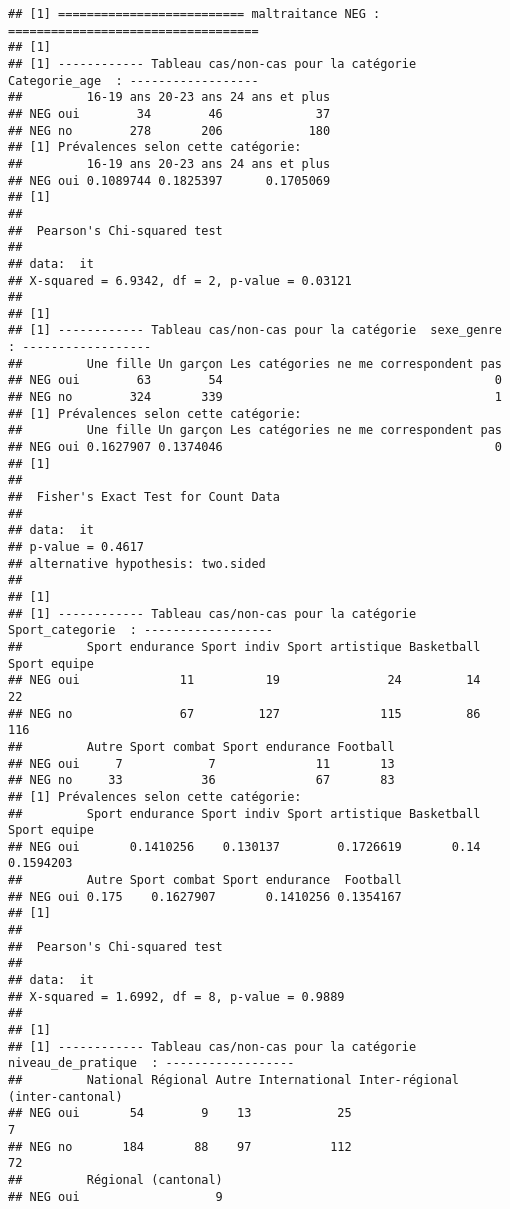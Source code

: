 \documentclass[
]{article}
\begin{document}
\begin{verbatim}
## [1] ========================== maltraitance NEG : ===================================
## [1] 
## [1] ------------ Tableau cas/non-cas pour la catégorie  Categorie_age  : ------------------
##         16-19 ans 20-23 ans 24 ans et plus
## NEG oui        34        46             37
## NEG no        278       206            180
## [1] Prévalences selon cette catégorie:
##         16-19 ans 20-23 ans 24 ans et plus
## NEG oui 0.1089744 0.1825397      0.1705069
## [1] 
## 
##  Pearson's Chi-squared test
## 
## data:  it
## X-squared = 6.9342, df = 2, p-value = 0.03121
## 
## [1] 
## [1] ------------ Tableau cas/non-cas pour la catégorie  sexe_genre  : ------------------
##         Une fille Un garçon Les catégories ne me correspondent pas
## NEG oui        63        54                                      0
## NEG no        324       339                                      1
## [1] Prévalences selon cette catégorie:
##         Une fille Un garçon Les catégories ne me correspondent pas
## NEG oui 0.1627907 0.1374046                                      0
## [1] 
## 
##  Fisher's Exact Test for Count Data
## 
## data:  it
## p-value = 0.4617
## alternative hypothesis: two.sided
## 
## [1] 
## [1] ------------ Tableau cas/non-cas pour la catégorie  Sport_categorie  : ------------------
##         Sport endurance Sport indiv Sport artistique Basketball Sport equipe
## NEG oui              11          19               24         14           22
## NEG no               67         127              115         86          116
##         Autre Sport combat Sport endurance Football
## NEG oui     7            7              11       13
## NEG no     33           36              67       83
## [1] Prévalences selon cette catégorie:
##         Sport endurance Sport indiv Sport artistique Basketball Sport equipe
## NEG oui       0.1410256    0.130137        0.1726619       0.14    0.1594203
##         Autre Sport combat Sport endurance  Football
## NEG oui 0.175    0.1627907       0.1410256 0.1354167
## [1] 
## 
##  Pearson's Chi-squared test
## 
## data:  it
## X-squared = 1.6992, df = 8, p-value = 0.9889
## 
## [1] 
## [1] ------------ Tableau cas/non-cas pour la catégorie  niveau_de_pratique  : ------------------
##         National Régional Autre International Inter-régional (inter-cantonal)
## NEG oui       54        9    13            25                               7
## NEG no       184       88    97           112                              72
##         Régional (cantonal)
## NEG oui                   9

\end{verbatim}
\end{document}
